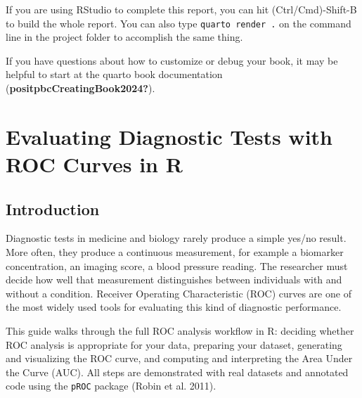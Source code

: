 \documentclass[
  letterpaper,
  DIV=11,
  numbers=noendperiod]{scrreprt}
\begin{document}
\begin{tcolorbox}[enhanced jigsaw, opacityback=0, opacitybacktitle=0.6, toptitle=1mm, leftrule=.75mm, colback=white, titlerule=0mm, title=\textcolor{quarto-callout-caution-color}{\faFire}\hspace{0.5em}{Building the report}, coltitle=black, colbacktitle=quarto-callout-caution-color!10!white, left=2mm, bottomrule=.15mm, bottomtitle=1mm, arc=.35mm, toprule=.15mm, rightrule=.15mm, breakable, colframe=quarto-callout-caution-color-frame]

If you are using RStudio to complete this report, you can hit
(Ctrl/Cmd)-Shift-B to build the whole report. You can also type
\texttt{quarto\ render\ .} on the command line in the project folder to
accomplish the same thing.

If you have questions about how to customize or debug your book, it may
be helpful to start at the quarto book documentation
(\textbf{positpbcCreatingBook2024?}).

\end{tcolorbox}


\chapter{Evaluating Diagnostic Tests with ROC Curves in
R}\label{evaluating-diagnostic-tests-with-roc-curves-in-r}

\section{Introduction}\label{introduction}

Diagnostic tests in medicine and biology rarely produce a simple yes/no
result. More often, they produce a continuous measurement, for example a
biomarker concentration, an imaging score, a blood pressure reading. The
researcher must decide how well that measurement distinguishes between
individuals with and without a condition. Receiver Operating
Characteristic (ROC) curves are one of the most widely used tools for
evaluating this kind of diagnostic performance.

This guide walks through the full ROC analysis workflow in R: deciding
whether ROC analysis is appropriate for your data, preparing your
dataset, generating and visualizing the ROC curve, and computing and
interpreting the Area Under the Curve (AUC). All steps are demonstrated
with real datasets and annotated code using the \texttt{pROC} package
(Robin et al. 2011).
\end{document}
